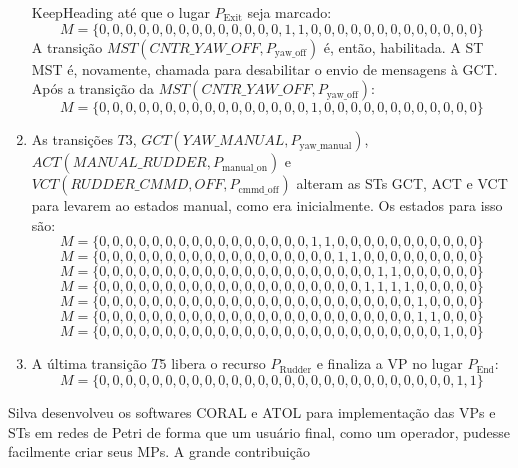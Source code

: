 \begin{enumerate}
  KeepHeading até que o lugar $P_{\textrm{Exit}}$ seja marcado:
$$M
=\{0,0,0,0,0,0,0,0,0,0,0,0,0,0,1,1,0,0,0,0,0,0,0,0,0,0,0,0,0\}$$
A transição $MST(CNTR\_YAW\_OFF,P_{\textrm{yaw\_off}})$ é, então, habilitada. A
ST MST é, novamente, chamada para desabilitar o envio de mensagens à GCT. Após a
transição da $MST(CNTR\_YAW\_OFF,P_{\textrm{yaw\_off}})$:
$$M
=\{0,0,0,0,0,0,0,0,0,0,0,0,0,0,0,0,1,0,0,0,0,0,0,0,0,0,0,0,0\}$$
  \item As transições $T3$, $GCT(YAW\_MANUAL,P_{\textrm{yaw\_manual}})$,
  $ACT(MANUAL\_RUDDER,P_{\textrm{manual\_on}})$ e
  $VCT(RUDDER\_CMMD,OFF,P_{\textrm{cmmd\_off}})$ alteram as STs GCT, ACT e VCT
  para levarem ao estados manual, como era inicialmente. Os estados para isso
  são:
$$M
=\{0,0,0,0,0,0,0,0,0,0,0,0,0,0,0,0,1,1,0,0,0,0,0,0,0,0,0,0,0\}$$
$$M
=\{0,0,0,0,0,0,0,0,0,0,0,0,0,0,0,0,0,0,1,1,0,0,0,0,0,0,0,0,0\}$$
$$M
=\{0,0,0,0,0,0,0,0,0,0,0,0,0,0,0,0,0,0,0,0,0,1,1,0,0,0,0,0,0\}$$
$$M
=\{0,0,0,0,0,0,0,0,0,0,0,0,0,0,0,0,0,0,0,0,1,1,1,1,0,0,0,0,0\}$$
$$M
=\{0,0,0,0,0,0,0,0,0,0,0,0,0,0,0,0,0,0,0,0,0,0,0,0,1,0,0,0,0\}$$
$$M
=\{0,0,0,0,0,0,0,0,0,0,0,0,0,0,0,0,0,0,0,0,0,0,0,0,1,1,0,0,0\}$$
$$M
=\{0,0,0,0,0,0,0,0,0,0,0,0,0,0,0,0,0,0,0,0,0,0,0,0,0,0,1,0,0\}$$  
  \item A última transição $T5$ libera o recurso $P_{\textrm{Rudder}}$ e
  finaliza a VP no lugar $P_{\textrm{End}}$:
$$M
=\{0,0,0,0,0,0,0,0,0,0,0,0,0,0,0,0,0,0,0,0,0,0,0,0,0,0,0,1,1\}$$
\end{enumerate} 

Silva desenvolveu os softwares CORAL e ATOL para implementação das VPs e STs em
redes de Petri de forma que um usuário final, como um operador, pudesse
facilmente criar seus MPs. A grande contribuição 




